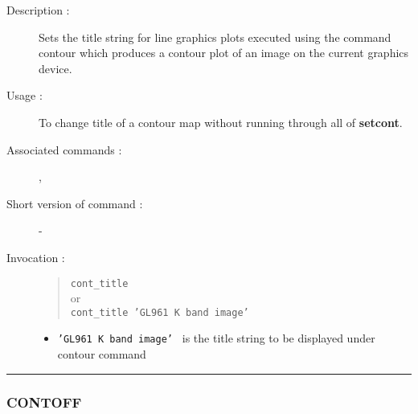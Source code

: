 \begin{description}

\item[Description :] Sets the title string for line graphics plots
executed using the command contour which produces a contour plot of an
image on the current graphics device.

\item[Usage :] To change title of a contour map without running through
all of {\bf setcont}.
\item[Associated commands :] {\tt {}},
{\tt {}}
\item[Short version of command :] -
\item[Invocation :]

\begin{quote}{\tt  cont\_title }\\
or \\
{\tt cont\_title 'GL961 K band image' }
\end{quote}

\begin{itemize}

\item {\tt 'GL961 K band image' } is the title string to be displayed
under contour command
\end{itemize}

\end{description}

\hrule
\subsubsection*{\label{CONTOFF}CONTOFF}

